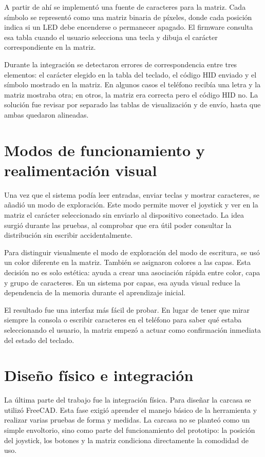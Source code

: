 A partir de ahí se implementó una fuente de caracteres para la matriz. Cada símbolo se representó como una matriz binaria de píxeles, donde cada posición indica si un LED debe encenderse o permanecer apagado. El firmware consulta esa tabla cuando el usuario selecciona una tecla y dibuja el carácter correspondiente en la matriz.

Durante la integración se detectaron errores de correspondencia entre tres elementos: el carácter elegido en la tabla del teclado, el código HID enviado y el símbolo mostrado en la matriz. En algunos casos el teléfono recibía una letra y la matriz mostraba otra; en otros, la matriz era correcta pero el código HID no. La solución fue revisar por separado las tablas de visualización y de envío, hasta que ambas quedaron alineadas.

\section{Modos de funcionamiento y realimentación visual}
\label{sec:modos-realimentacion}

Una vez que el sistema podía leer entradas, enviar teclas y mostrar caracteres, se añadió un modo de exploración. Este modo permite mover el joystick y ver en la matriz el carácter seleccionado sin enviarlo al dispositivo conectado. La idea surgió durante las pruebas, al comprobar que era útil poder consultar la distribución sin escribir accidentalmente.

Para distinguir visualmente el modo de exploración del modo de escritura, se usó un color diferente en la matriz. También se asignaron colores a las capas. Esta decisión no es solo estética: ayuda a crear una asociación rápida entre color, capa y grupo de caracteres. En un sistema por capas, esa ayuda visual reduce la dependencia de la memoria durante el aprendizaje inicial.

El resultado fue una interfaz más fácil de probar. En lugar de tener que mirar siempre la consola o escribir caracteres en el teléfono para saber qué estaba seleccionando el usuario, la matriz empezó a actuar como confirmación inmediata del estado del teclado.

\section{Diseño físico e integración}
\label{sec:resultado-integracion-fisica}

La última parte del trabajo fue la integración física. Para diseñar la carcasa se utilizó FreeCAD. Esta fase exigió aprender el manejo básico de la herramienta y realizar varias pruebas de forma y medidas. La carcasa no se planteó como un simple envoltorio, sino como parte del funcionamiento del prototipo: la posición del joystick, los botones y la matriz condiciona directamente la comodidad de uso.

